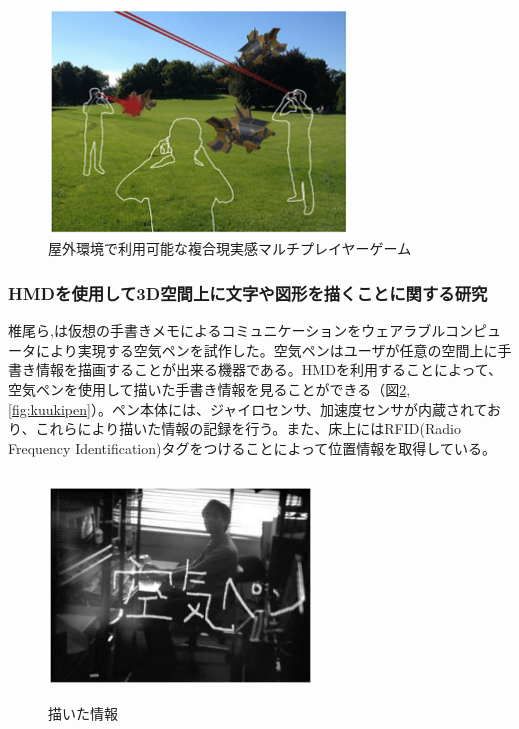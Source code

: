 \documentclass[11pt,a4j, titlepage]{jarticle} %
\begin{document}
\begin{figure}[H]
  \begin{center}
    \includegraphics[clip,height=6.0cm,width=8.0cm]{./augmented_invaders.eps}
    \caption{屋外環境で利用可能な複合現実感マルチプレイヤーゲーム}
    \label{fig:augmented_invaders}
  \end{center}
\end{figure}

\subsubsection{HMDを使用して3D空間上に文字や図形を描くことに関する研究}
椎尾ら\cite{siio},\cite{siio2}は仮想の手書きメモによるコミュニケーションをウェアラブルコンピュータにより実現する空気ペンを試作した。空気ペンはユーザが任意の空間上に手書き情報を描画することが出来る機器である。HMDを利用することによって、空気ペンを使用して描いた手書き情報を見ることができる（図\ref{fig:tegakijouhou}, \ref{fig:kuukipen}）。ペン本体には、ジャイロセンサ、加速度センサが内蔵されており、これらにより描いた情報の記録を行う。また、床上にはRFID(Radio Frequency Identification)タグをつけることによって位置情報を取得している。

\begin{figure}[H]
  \begin{center}
    \includegraphics[clip,height=6.0cm,width=7.0cm]{./tegakijouhou.eps}
    \caption{描いた情報}
    \label{fig:tegakijouhou}
  \end{center}
\end{figure}
\end{document}
